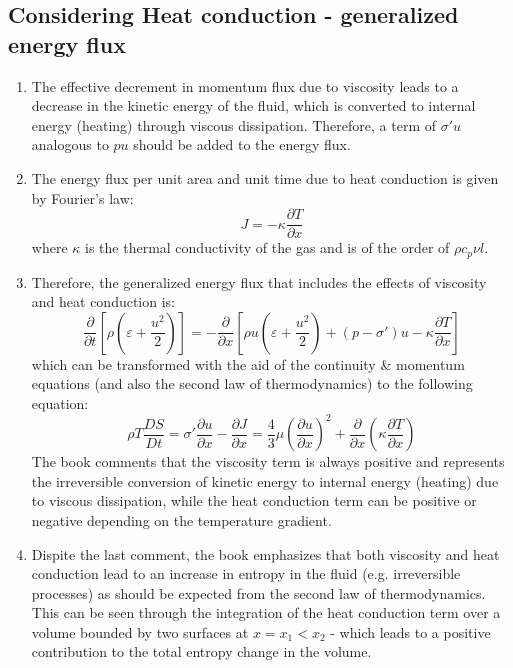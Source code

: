 ﻿\documentclass[11pt]{article}
\begin{document}
  \subsection{Considering Heat conduction - generalized energy flux}
  \begin{enumerate}
    \item The effective decrement in momentum flux due to viscosity leads to a decrease in the kinetic energy of the fluid, which is converted to internal energy (heating) through viscous dissipation. Therefore, a term of $\sigma'u$ analogous to $pu$ should be added to the energy flux.
    \item The energy flux per unit area and unit time due to heat conduction is given by Fourier's law:
    \begin{equation}
      J = -\kappa \frac{\partial T}{\partial x}
    \end{equation}
    where $\kappa$ is the thermal conductivity of the gas and is of the order of $\rho c_p \nu l$.
    \item Therefore, the generalized energy flux that includes the effects of viscosity and heat conduction is:
    \begin{equation}
      \frac{\partial}{\partial t} \left[ \rho \left( \varepsilon + \frac{u^2}{2} \right) \right] = -\frac{\partial}{\partial x} \left[ \rho u \left( \varepsilon + \frac{u^2}{2} \right) + (p - \sigma')u - \kappa \frac{\partial T}{\partial x} \right]
    \end{equation}
    which can be transformed with the aid of the continuity \& momentum equations (and also the second law of thermodynamics) to the following equation:
    \begin{equation}
      \rho T \frac{DS}{Dt} = \sigma' \frac{\partial u}{\partial x} - \frac{\partial J}{\partial x} = \frac{4}{3} \mu \left( \frac{\partial u}{\partial x} \right)^2 + \frac{\partial}{\partial x} \left( \kappa \frac{\partial T}{\partial x} \right)
    \end{equation}
    The book comments that the viscosity term is always positive and represents the irreversible conversion of kinetic energy to internal energy (heating) due to viscous dissipation, while the heat conduction term can be positive or negative depending on the temperature gradient.
    \item Dispite the last comment, the book emphasizes that both viscosity and heat conduction lead to an increase in entropy in the fluid (e.g. irreversible processes) as should be expected from the second law of thermodynamics. This can be seen through the integration of the heat conduction term over a volume bounded by two surfaces at $x=x_1<x_2$ - which leads to a positive contribution to the total entropy change in the volume.
    \end{enumerate}
\end{document}
